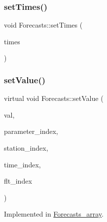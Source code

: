 \mbox{\label{class_forecasts_a85263c55dda71ef3363afbd2be337eed}} 
\subsubsection{\texorpdfstring{set\+Times()}{setTimes()}}
{\footnotesize\ttfamily void Forecasts\+::set\+Times (\begin{DoxyParamCaption}\item[{\mbox{\hyperlink{classanen_time_1_1_times}{anen\+Time\+::\+Times}}}]{times }\end{DoxyParamCaption})}

\mbox{\label{class_forecasts_a4ce21957ef296384b1e251098db953bc}} 
\subsubsection{\texorpdfstring{set\+Value()}{setValue()}\hspace{0.1cm}{\footnotesize\ttfamily [1/2]}}
{\footnotesize\ttfamily virtual void Forecasts\+::set\+Value (\begin{DoxyParamCaption}\item[{double}]{val,  }\item[{std\+::size\+\_\+t}]{parameter\+\_\+index,  }\item[{std\+::size\+\_\+t}]{station\+\_\+index,  }\item[{std\+::size\+\_\+t}]{time\+\_\+index,  }\item[{std\+::size\+\_\+t}]{flt\+\_\+index }\end{DoxyParamCaption})\hspace{0.3cm}{\ttfamily [pure virtual]}}



Implemented in \mbox{\hyperlink{class_forecasts__array_a19d59c93e8b7692ebae2d3e15dc43f87}{Forecasts\+\_\+array}}.

\mbox{\label{class_forecasts_a584820dc47f1b5c4cae099485ee59cbe}} 
